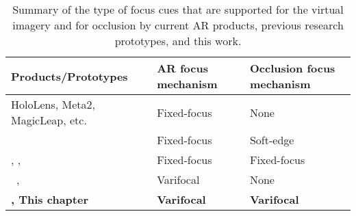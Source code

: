 \renewcommand{\arraystretch}{1.2}
\begin{table}[!htpb]
    \begin{center}
\begin{tabular}{|>{\centering\arraybackslash}m{8cm}|>{\centering\arraybackslash}m{2.0cm}|>{\centering\arraybackslash}m{2.5cm}|}
\hline
Products/Prototypes & AR focus mechanism & Occlusion focus mechanism \\
\hline
HoloLens, Meta2, MagicLeap, etc. & Fixed-focus & None \\
\hline
\citet{Itoh2017} & Fixed-focus & Soft-edge \\
\hline
\citet{Kiyokawa2003}, \citet{Howlett2017}, \citet{Cakmakci2004} & Fixed-focus & Fixed-focus \\
\hline
~\citet{Dunn2017Wide}, \citet{Aksit2017Near} & Varifocal & None \\
\hline
\textbf{\citet{Hamasaki2019}, This chapter} & \textbf{Varifocal} & \textbf{Varifocal} \\
\hline
\end{tabular}
    \end{center}
\caption[Varifocal-Occlusion NED: comparison of focus mechanisms for virtual imagery and occlusion mask in AR displays]{Summary of the type of focus cues that are supported for the virtual imagery and for occlusion by current AR products, previous research prototypes, and this work.}
\label{tab:comparison}
\end{table}
